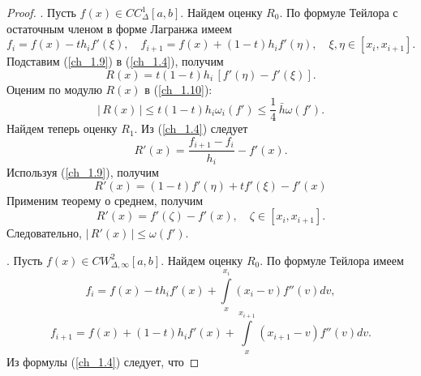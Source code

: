 ﻿\documentclass[a4paper,14pt]{extreport}
\newcommand{\RNumb}[1]{\uppercase\expandafter{\romannumeral #1\relax}}
\begin{document}
\begin{proof}
        \par\vspace{3mm}\RNumb{3}. Пусть $f(x)\in CC_\Delta^1[a,b]$. Найдем оценку $R_0$. По формуле Тейлора с остаточным членом в форме Лагранжа имеем
        \begin{equation}
            \label{ch_1.9}
            f_i=f(x)-th_if'(\xi),\quad f_{i+1}=f(x)+(1-t)h_if'(\eta),\quad \xi,\eta\in[x_i,x_{i+1}].
        \end{equation}
        Подставим (\ref{ch_1.9}) в (\ref{ch_1.4}), получим
        \begin{equation}
            \label{ch_1.10}
            R(x)=t(1-t)h_i\,\left[f'(\eta)-f'(\xi)\right].
        \end{equation}
        Оценим по модулю $R(x)$ в (\ref{ch_1.10}):
        \begin{equation}
            \label{ch_1.11}
            |\,R(x)\,|\leqslant t(1-t)h_i\omega_i(f')\leqslant\dfrac14\,\bar{h}\omega(f').
        \end{equation}
        Найдем теперь оценку $R_1$. Из (\ref{ch_1.4}) следует
        \begin{equation}
            \label{ch_1.12}
            R'(x)=\dfrac{f_{i+1}-f_i}{h_i} - f'(x).
        \end{equation}
        Используя (\ref{ch_1.9}), получим
        \begin{equation}
            \label{ch_1.13}
            R'(x)=(1-t)f'(\eta)+tf'(\xi)-f'(x)
        \end{equation}
        Применим теорему о среднем, получим
        \begin{equation*}
            R'(x)=f'(\zeta)-f'(x),\quad \zeta\in[x_i,x_{i+1}].
        \end{equation*}
        Следовательно, $|\,R'(x)\,|\leqslant\omega(f')$.
        \par\vspace{3mm}\RNumb{4}. Пусть $f(x)\in CW_{\Delta,\infty}^2[a,b]$. Найдем оценку $R_0$. По формуле Тейлора имеем
        \begin{equation}
            \label{ch_1.14}
            f_{i}=f(x)-t h_{i} f'(x)+\int\limits_{x}^{x_{i}}(x_{i}-v) f''(v) dv,
        \end{equation}
        \begin{equation}
            \label{ch_1.15}
            f_{i+1}=f(x)+(1-t) h_{i} f'(x)+\int\limits_{x}^{x_{i+1}}(x_{i+1}-v) f''(v) dv .
        \end{equation}
        Из формулы (\ref{ch_1.4}) следует, что 

\end{proof}
\end{document}
